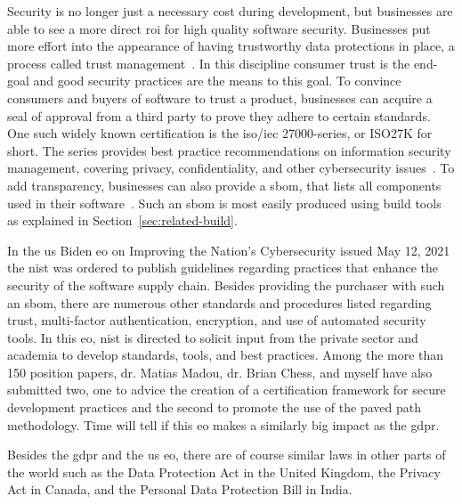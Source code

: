 Security is no longer just a necessary cost during development, but businesses are able to see a more direct \gls{roi} for high quality software security.
Businesses put more effort into the appearance of having trustworthy data protections in place, a process called trust management~\cite{cassandra2021analysis, ashraf2020role}.
In this discipline consumer trust is the end-goal and good security practices are the means to this goal.
To convince consumers and buyers of software to trust a product, businesses can acquire a seal of approval from a third party to prove they adhere to certain standards.
One such widely known certification is the \gls{iso}/\gls{iec} 27000-series, or ISO27K for short.
The series provides best practice recommendations on information security management, covering privacy, confidentiality, and other cybersecurity issues~\cite{iso27k}.
To add transparency, businesses can also provide a \gls{sbom}, that lists all components used in their software~\cite{sbomntia}.
Such an \gls{sbom} is most easily produced using build tools as explained in Section~\ref{sec:related-build}.

In the \gls{us} Biden \gls{eo} on Improving the Nation's Cybersecurity issued May 12, 2021 the \gls{nist} was ordered to publish guidelines regarding practices that enhance the security of the software supply chain.
Besides providing the purchaser with such an \gls{sbom}, there are numerous other standards and procedures listed regarding trust, multi-factor authentication, encryption, and use of automated security tools.
In this \gls{eo}, \gls{nist} is directed to solicit input from the private sector and academia to develop standards, tools, and best practices.
Among the more than 150 position papers, dr. Matias Madou, dr. Brian Chess, and myself have also submitted two, one to advice the creation of a certification framework for secure development practices and the second to promote the use of the paved path methodology.
Time will tell if this \gls{eo} makes a similarly big impact as the \gls{gdpr}.

Besides the \gls{gdpr} and the \gls{us} \gls{eo}, there are of course similar laws in other parts of the world such as the Data Protection Act in the United Kingdom, the Privacy Act in Canada, and the Personal Data Protection Bill in India.

